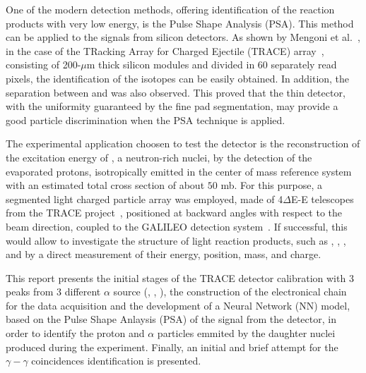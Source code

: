 One of the modern detection methods, offering identification of the reaction
products with very low energy, is the Pulse Shape Analysis (PSA). This method
can be applied to the signals from silicon detectors. As shown by Mengoni et
al.~\cite{mengoni}, in the case of the TRacking Array for Charged Ejectile (TRACE) array~\cite{mengoni}, consisting
of 200-$\mu$m thick silicon modules and divided in 60 separately read pixels,
the identification of the  isotopes can be easily obtained.
In addition, the separation between  and  was also
observed. This proved that the thin detector, with the uniformity guaranteed
by the fine pad segmentation, may provide a good particle discrimination when
the PSA technique is applied.

\bigbreak

The experimental application choosen to test the detector is the reconstruction of the excitation energy of ,
a neutron-rich nuclei, by the detection of the evaporated protons,
isotropically emitted in the center of mass reference system with an estimated total cross section of about $50$ mb. For this purpose, a segmented light
charged particle array was employed, made of 4$\Delta$E-E telescopes from the
TRACE project~\cite{mengoni}, positioned at backward angles with respect to
the beam direction, coupled to the GALILEO detection system~\cite{galileo}.
If successful, this would allow to investigate the structure of light reaction
products, such as , , ,  and  by a direct
measurement of their energy, position, mass, and charge.

\bigbreak

This report presents the initial stages of the TRACE detector calibration
with 3 peaks from 3 different $\alpha$ source (, ,
), the construction of the electronical chain for the data
acquisition and the development of a Neural Network (NN) model, based on the
Pulse Shape Anlaysis (PSA) of the signal from the detector, in order to
identify the proton and $\alpha$ particles emmited by the daughter nuclei
produced during the experiment. Finally, an initial and brief attempt for the
$\gamma-\gamma$ coincidences identification is presented.